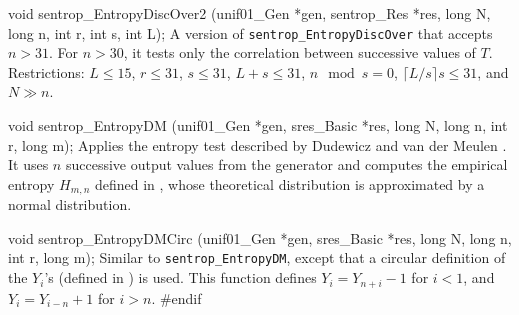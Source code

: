 void sentrop_EntropyDiscOver2 (unif01_Gen *gen, sentrop_Res *res,
                               long N, long n, int r, int s, int L);
\endcode
\tab
  A version
  of {\tt sentrop\_EntropyDiscOver} that accepts $n > 31$.
  For $n > 30$, it tests only the correlation between successive values
  of $T$.
  Restrictions: $L \le 15$, $r \le 31$, $ s \le 31$, $L + s \le 31$,
  $n \mod s =0$, $\lceil L/s\rceil s \le 31$, and $N \gg n$.
\endtab
\code


void sentrop_EntropyDM (unif01_Gen *gen, sres_Basic *res,
                        long N, long n, int r, long m);
\endcode
\tab
  Applies the entropy test
  described by Dudewicz and van der Meulen \cite{rDUD81b,rDUD95a}.
  It uses $n$ successive output values from the generator and computes
  the empirical entropy $H_{m,n}$ defined in \cite{rDUD81b,rDUD95a},
  whose theoretical distribution is approximated by a normal distribution.
\endtab
\code


void sentrop_EntropyDMCirc (unif01_Gen *gen, sres_Basic *res,
                            long N, long n, int r, long m);
\endcode
\tab
  Similar to {\tt sentrop\_EntropyDM}, except
  that  a  circular
  definition of the $Y_i$'s (defined in \cite{rDUD81b,rDUD95a}) is used.
  This function defines $Y_i = Y_{n+i} - 1$ for $i < 1$, and
  $Y_i = Y_{i-n} + 1$ for $i > n$.
\endtab
\code
\hide
#endif
\endhide
\endcode
